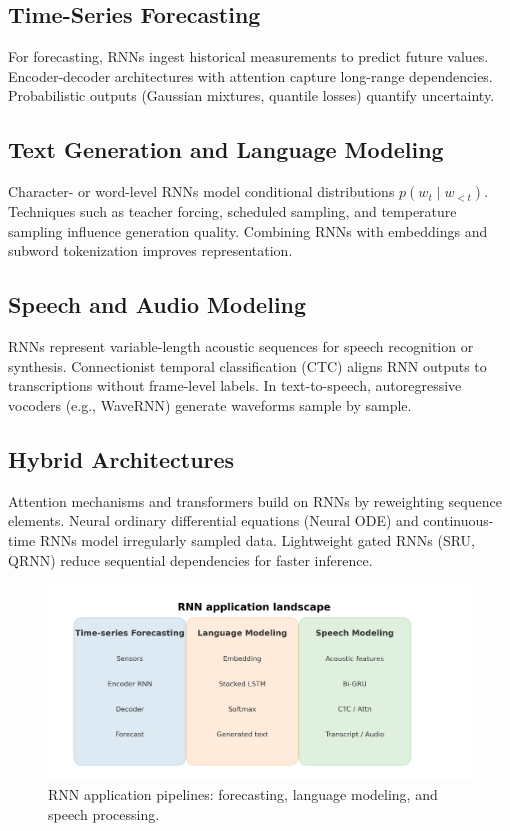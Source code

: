 ﻿\documentclass[12pt]{article}
\begin{document}
\subsection{Time-Series Forecasting}
For forecasting, RNNs ingest historical measurements to predict future values. Encoder-decoder architectures with attention capture long-range dependencies. Probabilistic outputs (Gaussian mixtures, quantile losses) quantify uncertainty.

\subsection{Text Generation and Language Modeling}
Character- or word-level RNNs model conditional distributions $p(w_t \mid w_{<t})$. Techniques such as teacher forcing, scheduled sampling, and temperature sampling influence generation quality. Combining RNNs with embeddings and subword tokenization improves representation.

\subsection{Speech and Audio Modeling}
RNNs represent variable-length acoustic sequences for speech recognition or synthesis. Connectionist temporal classification (CTC) aligns RNN outputs to transcriptions without frame-level labels. In text-to-speech, autoregressive vocoders (e.g., WaveRNN) generate waveforms sample by sample.

\subsection{Hybrid Architectures}
Attention mechanisms and transformers build on RNNs by reweighting sequence elements. Neural ordinary differential equations (Neural ODE) and continuous-time RNNs model irregularly sampled data. Lightweight gated RNNs (SRU, QRNN) reduce sequential dependencies for faster inference.

\begin{figure}[H]
  \centering
  \includegraphics[width=0.85\linewidth]{rnn_applications_overview.png}
  \caption{RNN application pipelines: forecasting, language modeling, and speech processing.}
  \label{fig:rnn_applications}
\end{figure}
\FloatBarrier
\end{document}
